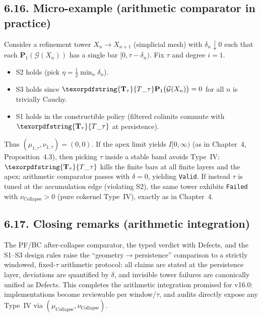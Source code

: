 \documentclass[11pt]{article}
\numberwithin{equation}{section}
\theoremstyle{plain}
\theoremstyle{definition}
\theoremstyle{remark}
\DeclareRobustCommand{\hyp}{\nobreakdash-}
\theoremstyle{plain}
\theoremstyle{definition}
\numberwithin{equation}{section}
\theoremstyle{definition}
\DeclareRobustCommand{\Ttau}{\texorpdfstring{\ensuremath{\mathbf{T}_{\tau}}}{T\_\tau}}
\DeclareRobustCommand{\muc}{\mu_{\mathrm{Collapse}}}
\DeclareRobustCommand{\nuc}{\nu_{\mathrm{Collapse}}}
\numberwithin{equation}{section}
\theoremstyle{plain}
\theoremstyle{definition}
\theoremstyle{remark}
\providecommand{\Tfun}[1]{\mathbf{T}_{#1}}
\providecommand{\Ttau}{\Tfun{\tau}}
\providecommand{\muc}{\mu_{\mathrm{Collapse}}}
\providecommand{\nuc}{\nu_{\mathrm{Collapse}}}
\begin{document}
\subsection*{6.16. Micro\hyp example (arithmetic comparator in practice)}
Consider a refinement tower \(X_n\to X_{n+1}\) (simplicial mesh) with \(\delta_n\downarrow 0\) such that each \(\mathbf{P}_1(\mathcal{G}(X_n))\) has a single bar \([0,\tau-\delta_n)\). Fix \(\tau\) and degree \(i=1\).

\begin{itemize}
  \item S2 holds (pick \(\eta=\frac{1}{2}\min_n\delta_n\)).
  \item S3 holds since \(\Ttau\mathbf{P}_1\big(\mathcal{G}(X_n)\big)=0\) for all \(n\) is trivially Cauchy.
  \item S1 holds in the constructible policy (filtered colimits commute with \(\Ttau\) at persistence).
\end{itemize}
Thus \((\mu_{1,\tau},\nu_{1,\tau})=(0,0)\). If the apex limit yields \(I[0,\infty)\) (as in Chapter~4, Proposition~4.3), then picking \(\tau\) inside a stable band avoids Type~IV: \(\Ttau\) kills the finite bars at all finite layers and the apex; arithmetic comparator passes with \(\delta=0\), yielding \texttt{Valid}. If instead \(\tau\) is tuned at the accumulation edge (violating S2), the same tower exhibits \texttt{Failed} with \(\nuc>0\) (pure cokernel Type~IV), exactly as in Chapter~4.

\subsection*{6.17. Closing remarks (arithmetic integration)}
The PF/BC after\hyp collapse comparator, the typed verdict with Defects, and the S1–S3 design rules raise the “geometry\(\to\)persistence” comparison to a strictly windowed, fixed\hyp \(\tau\) arithmetic protocol: all claims are stated at the persistence layer, deviations are quantified by \(\delta\), and invisible tower failures are canonically unified as Defects. This completes the arithmetic integration promised for v16.0: implementations become reviewable per window/\(\tau\), and audits directly expose any Type~IV via \((\muc,\nuc)\).



\end{document}
